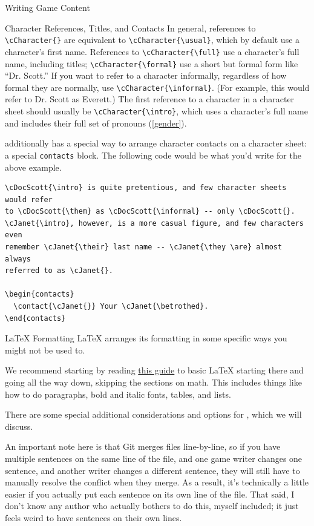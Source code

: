 \documentclass[sheet]{GameTexBase}
\begin{document}
\begin{section}{Writing Game Content}
\begin{subsection}{Character References, Titles, and Contacts}
In general, references to \lstinline|\cCharacter{}| are equivalent to \lstinline|\cCharacter{\usual}|, which by default use a character's first name.  References to \lstinline|\cCharacter{\full}| use a character's full name, including titles; \lstinline|\cCharacter{\formal}| use a short but formal form like ``Dr. Scott.''   If you want to refer to a character informally, regardless of how formal they are normally, use \lstinline|\cCharacter{\informal}|.  (For example, this would refer to Dr. Scott as Everett.)
The first reference to a character in a character sheet should usually be \lstinline|\cCharacter{\intro}|, which uses a character's full name and includes their full set of pronouns (\ref{gender}).

\gametex{} additionally has a special way to arrange character contacts on a character sheet: a special \lstinline|contacts| block.  The following \gametex{} code would be what you'd write for the above example.
\begin{verbatim}
\cDocScott{\intro} is quite pretentious, and few character sheets would refer
to \cDocScott{\them} as \cDocScott{\informal} -- only \cDocScott{}.
\cJanet{\intro}, however, is a more casual figure, and few characters even
remember \cJanet{\their} last name -- \cJanet{\they \are} almost always
referred to as \cJanet{}.

\begin{contacts}
  \contact{\cJanet{}} Your \cJanet{\betrothed}.
\end{contacts}
\end{verbatim}
\end{subsection}
\begin{subsection}{\LaTeX{} Formatting}
LaTeX arranges its formatting in some specific ways you might not be used to.

We recommend starting by reading \href{https://www.overleaf.com/learn/latex/Learn_LaTeX_in_30_minutes#Adding_comments}{this guide} to basic \LaTeX{} starting there and going all the way down, skipping the sections on math.
This includes things like how to do paragraphs, bold and italic fonts, tables, and lists.

There are some special additional considerations and options for \gametex{}, which we will discuss.

An important note here is that Git merges files line-by-line, so if you have multiple sentences on the same line of the file, and one game writer changes one sentence, and another writer changes a different sentence, they will still have to manually resolve the conflict when they merge.  As a result, it's technically a little easier if you actually put each sentence on its own line of the file.  That said, I don't know any author who actually bothers to do this, myself included; it just feels weird to have sentences on their own lines.


\end{subsection}
\end{section}
\end{document}

